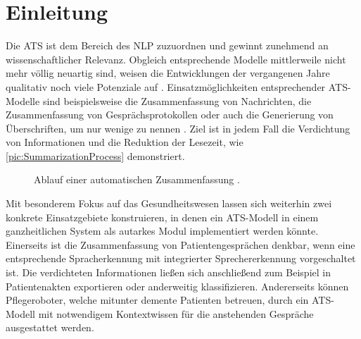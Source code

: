 \chapter{Einleitung}
\thispagestyle{fancy}
\label{chap:Einleitung}

\noindent
Die \ac{ATS} ist dem Bereich des \ac{NLP} zuzuordnen und gewinnt zunehmend an wissenschaftlicher Relevanz. Obgleich entsprechende Modelle mittlerweile nicht mehr völlig neuartig sind, weisen die Entwicklungen der vergangenen Jahre qualitativ noch viele Potenziale auf \cite[S.~1-2]{YAN19}. Einsatzmöglichkeiten entsprechender \ac{ATS}-Modelle sind beispielsweise die Zusammenfassung von Nachrichten, die Zusammenfassung von Gesprächsprotokollen oder auch die Generierung von Überschriften, um nur wenige zu nennen \cite{GON20}. Ziel ist in jedem Fall die Verdichtung von Informationen und die Reduktion der Lesezeit, wie \autoref{pic:SummarizationProcess} demonstriert.

\begin{figure}[h]
  \centering
  \caption{Ablauf einer automatischen Zusammenfassung \cite{THA19}.}
  \label{pic:SummarizationProcess}
\end{figure}

\noindent
Mit besonderem Fokus auf das Gesundheitswesen lassen sich weiterhin zwei konkrete Einsatzgebiete konstruieren, in denen ein \ac{ATS}-Modell in einem ganzheitlichen System als autarkes Modul implementiert werden könnte. Einerseits ist die Zusammenfassung von Patientengesprächen denkbar, wenn eine entsprechende Spracherkennung mit integrierter Sprechererkennung vorgeschaltet ist. Die verdichteten Informationen ließen sich anschließend zum Beispiel in Patientenakten exportieren oder anderweitig klassifizieren. Andererseits können Pflegeroboter, welche mitunter demente Patienten betreuen, durch ein \ac{ATS}-Modell mit notwendigem Kontextwissen für die anstehenden Gespräche ausgestattet werden.
\newpage

